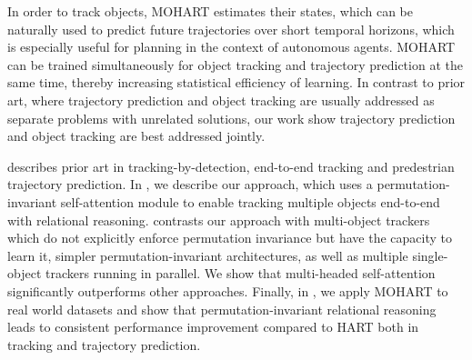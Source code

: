 In order to track objects, \gls{MOHART} estimates their states, which can be naturally used to predict future trajectories over short temporal horizons, which is especially useful for planning in the context of autonomous agents.
\gls{MOHART} can be trained simultaneously for object tracking and trajectory prediction at the same time, thereby increasing statistical efficiency of learning. 
In contrast to prior art, where trajectory prediction and object tracking are usually addressed as separate problems with unrelated solutions, our work show trajectory prediction and object tracking are best addressed jointly.

 describes prior art in tracking-by-detection, end-to-end tracking and predestrian trajectory prediction. In , we describe our approach, which uses a permutation-invariant self-attention module to enable tracking multiple objects end-to-end with relational reasoning. 
 contrasts our approach with multi-object trackers which do not explicitly enforce permutation invariance but have the capacity to learn it, simpler permutation-invariant architectures, as well as multiple single-object trackers running in parallel.
We show that multi-headed self-attention significantly outperforms other approaches. 
Finally, in , we apply \gls{MOHART} to real world datasets and show that permutation-invariant relational reasoning leads to consistent performance improvement compared to \gls{HART} both in tracking and trajectory prediction.





